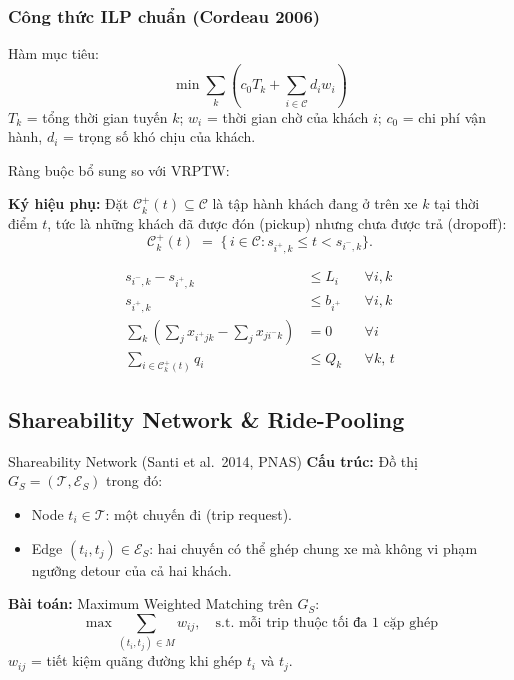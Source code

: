 \documentclass[12pt,a4paper]{article}
\begin{document}
\subsubsection{Công thức ILP chuẩn (Cordeau 2006)}

Hàm mục tiêu:
\begin{equation}
  \min\sum_k\left(c_0 T_k + \sum_{i\in\mathcal{C}}d_i w_i\right)
\end{equation}
$T_k$ = tổng thời gian tuyến $k$; $w_i$ = thời gian chờ của khách $i$;
$c_0$ = chi phí vận hành, $d_i$ = trọng số khó chịu của khách.

Ràng buộc bổ sung so với VRPTW:

\medskip
\noindent\textbf{Ký hiệu phụ:} Đặt $\mathcal{C}^+_k(t) \subseteq \mathcal{C}$ là tập hành khách đang ở trên xe $k$ tại thời điểm $t$, tức là những khách đã được đón (pickup) nhưng chưa được trả (dropoff):
\[
  \mathcal{C}^+_k(t) \;=\; \bigl\{\,i\in\mathcal{C} : s_{i^+,k} \leq t < s_{i^-,k}\bigr\}.
\]

\begin{align}
  s_{i^-,k} - s_{i^+,k} &\leq L_i &&\forall i,k \tag{D1: Max ride time}\\
  s_{i^+,k} &\leq b_{i^+} &&\forall i,k \tag{D2: Pickup window}\\
  \sum_k\left(\sum_j x_{i^+jk} - \sum_j x_{ji^-k}\right) &= 0 &&\forall i \tag{D3: Pairing}\\
  \sum_{i\in\mathcal{C}^+_k(t)}q_i &\leq Q_k &&\forall k,\,t \tag{D4: Capacity (seats)}
\end{align}

\subsection{Shareability Network \& Ride-Pooling}

\begin{ridebox}{Shareability Network (Santi et al.~2014, PNAS)}
\textbf{Cấu trúc:} Đồ thị $G_S=(\mathcal{T},\mathcal{E}_S)$ trong đó:
\begin{itemize}
  \item Node $t_i\in\mathcal{T}$: một chuyến đi (trip request).
  \item Edge $(t_i,t_j)\in\mathcal{E}_S$: hai chuyến có thể ghép chung xe
        mà không vi phạm ngưỡng detour của cả hai khách.
\end{itemize}
\textbf{Bài toán:} Maximum Weighted Matching trên $G_S$:
\begin{equation}
  \max\sum_{(t_i,t_j)\in M}w_{ij},
  \quad\text{s.t. mỗi trip thuộc tối đa 1 cặp ghép}
\end{equation}
$w_{ij}$ = tiết kiệm quãng đường khi ghép $t_i$ và $t_j$.
\end{ridebox}
\end{document}
